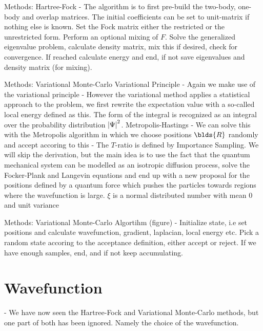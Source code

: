 \documentclass[10pt]{beamer}
\begin{document}
\begin{frame}[fragile]{Methods: Hartree-Fock}
    - The algorithm is to first pre-build the two-body, one-body and overlap
    matrices. The initial coefficients can be set to unit-matrix if nothing
    else is known. Set the Fock matrix either the restricted or the
    unrestricted form. Perform an optional mixing of $F$. Solve the generalized
    eigenvalue problem, calculate density matrix, mix this if desired, check
    for convergence. If reached calculate energy and end, if not save
    eigenvalues and density matrix (for mixing).
\end{frame}

\begin{frame}[fragile]{Methods: Variational Monte-Carlo}
    Variational Principle
        - Again we make use of the variational principle
        - However the variational method applies a statistical approach to the
        problem, we first rewrite the expectation value with a so-called local
        energy defined as this. The form of the integral is recognized as an
        integral over the probability distribution $\abs{\Psi}^2$.
   Metropolis-Hastings
        - We can solve this with the Metropolis algorithm in which we choose
        positions $\blds{R}$ randomly and accept accoring to this
        - The $T$-ratio is defined by Importance Sampling. We will skip the
        derivation, but the main idea is to use the fact that the quantum
        mechanical system can be modelled as an isotropic diffusion process,
        solve the Focker-Plank and Langevin equations and end up with a new
        proposal for the positions defined by a quantum force which pushes the
        particles towards regions where the wavefunction is large. $\xi$ is a
        normal distributed number with mean $0$ and unit variance
\end{frame}

\begin{frame}[fragile]{Methods: Variational Monte-Carlo}
    Algortihm (figure)
        - Initialize state, i.e set positions and calculate wavefunction,
        gradient, laplacian, local energy etc. Pick a random state accoring to
        the acceptance definition, either accept or reject. If we have enough
        samples, end, and if not keep accumulating.
\end{frame}

\section{Wavefunction}
    - We have now seen the Hartree-Fock and Variational Monte-Carlo methods,
    but one part of both has been ignored. Namely the choice of the
    wavefunction.
\end{document}
